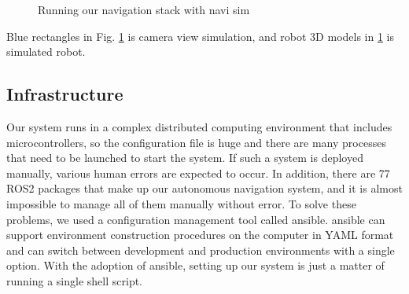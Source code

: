 \documentclass[lettersize,journal]{IEEEtran}
\begin{document}
\begin{figure}[H]
    \begin{center}
    \end{center}
    \caption{Running our navigation stack with navi sim}
    \label{fig:navi_sim}
\end{figure}

Blue rectangles in Fig. \ref{fig:navi_sim} is camera view simulation, and robot 3D models in \ref{fig:navi_sim} is simulated robot.

\subsection{Infrastructure}
Our system runs in a complex distributed computing environment that includes microcontrollers,
so the configuration file is huge and there are many processes that need to be launched to start the system.
If such a system is deployed manually, various human errors are expected to occur.
In addition, there are 77 ROS2 packages that make up our autonomous navigation system,
and it is almost impossible to manage all of them manually without error.
To solve these problems, we used a configuration management tool called ansible.
ansible can support environment construction procedures on the computer in YAML format and
can switch between development and production environments with a single option.
With the adoption of ansible, setting up our system is just a matter of running a single shell script.
\end{document}
